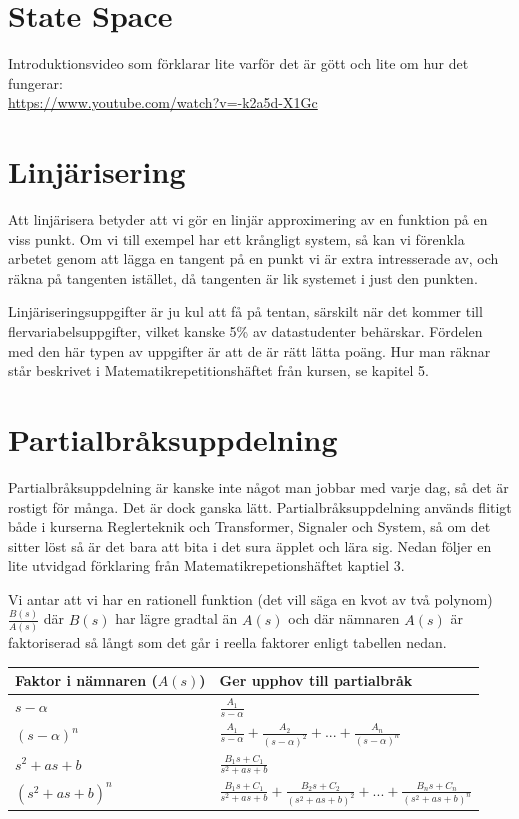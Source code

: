 \documentclass[a4paper]{article}
\begin{document}
\section{State Space}
Introduktionsvideo som förklarar lite varför det är gött och lite om hur det fungerar:\\
\href{https://www.youtube.com/watch?v=-k2a5d-X1Gc}{https://www.youtube.com/watch?v=-k2a5d-X1Gc}


\section{Linjärisering}
\label{sec:linjärisering}
Att linjärisera betyder att vi gör en linjär approximering av en funktion på en viss punkt. Om vi till exempel har ett krångligt system, så kan vi förenkla arbetet genom att lägga en tangent på en punkt vi är extra intresserade av, och räkna på tangenten istället, då tangenten är lik systemet i just den punkten.

Linjäriseringsuppgifter är ju kul att få på tentan, särskilt när det kommer till flervariabelsuppgifter, vilket kanske 5\% av datastudenter behärskar. Fördelen med den här typen av uppgifter är att de är rätt lätta poäng. Hur man räknar står beskrivet i Matematikrepetitionshäftet från kursen, se kapitel 5.


\section{Partialbråksuppdelning}
\label{sec:partialbråksuppdelning}
Partialbråksuppdelning är kanske inte något man jobbar med varje dag, så det är rostigt för många. Det är dock ganska lätt. Partialbråksuppdelning används flitigt både i kurserna Reglerteknik och Transformer, Signaler och System, så om det sitter löst så är det bara att bita i det sura äpplet och lära sig. Nedan följer en lite utvidgad förklaring från Matematikrepetionshäftet kaptiel 3.

Vi antar att vi har en rationell funktion (det vill säga en kvot av två polynom) $\frac{B(s)}{A(s)}$ där $B(s)$ har lägre gradtal än $A(s)$ och där nämnaren $A(s)$ är faktoriserad så långt som det går i reella faktorer enligt tabellen nedan.

\begin{tabular}{l | l}
  Faktor i nämnaren ($A(s)$) & Ger upphov till partialbråk \\
  \hline
  $s - \alpha$       & $\frac{A_1}{s - \alpha}$ \\
  $(s - \alpha)^n$   & $\frac{A_1}{s - \alpha} + \frac{A_2}{(s - \alpha)^2} + ... + \frac{A_n}{(s - \alpha)^n}$ \\
  $s^2 + as + b$     & $\frac{B_1s + C_1}{s^2 + as + b}$ \\
  $(s^2 + as + b)^n$ & $\frac{B_1s + C_1}{s^2 + as + b} + \frac{B_2s + C_2}{(s^2 + as + b)^2} + ... + \frac{B_ns + C_n}{(s^2 + as + b)^n}$
\end{tabular}
\end{document}
